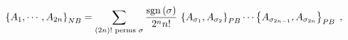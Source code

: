 \begin{equation}
\left\{  A_{1},\cdots,A_{2n}\right\}  _{{\footnotesize NB}}=\sum
_{\substack{\left(  2n\right)  !\text{\ perms }\sigma}%
}\frac{\operatorname{sgn}\left(  \sigma\right)  }{2^{n}n!}\,\left\{
A_{\sigma_{1}},A_{\sigma_{2}}\right\}  _{{\footnotesize PB}}\cdots\left\{
A_{\sigma_{2n-1}},A_{\sigma_{2n}}\right\}  _{{\footnotesize PB}}\;,
\end{equation}

